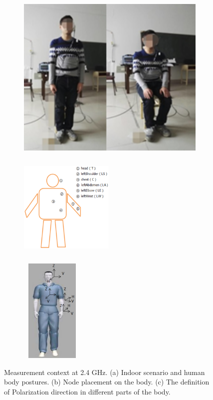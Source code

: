 \documentclass[conference]{IEEEtran}
\begin{document}
\begin{figure}[!t]
  \centering
  \begin{subfigure}[t]{0.3\textwidth}
  \includegraphics[width=\textwidth]{figs/1a.eps}
  \caption{}
  \label{fig:volunteer}
  \end{subfigure}
  \begin{subfigure}[t]{0.25\textwidth}
  \includegraphics[width=4.5cm,height=5cm]{figs/1b.eps}
  \caption{}
  \label{fig:placement}
  \end{subfigure}
  \begin{subfigure}[t]{0.19\textwidth}
  \includegraphics[width=3cm,height=5cm]{figs/1c.eps}
  \caption{}
  \label{fig:polarization_direction}
  \end{subfigure}
\caption{Measurement context at 2.4 GHz. (a) Indoor scenario and human body postures. (b) Node placement on the body. (c) The definition of Polarization direction in different parts of the body.}
\label{fig:human}
\end{figure}
\end{document}
